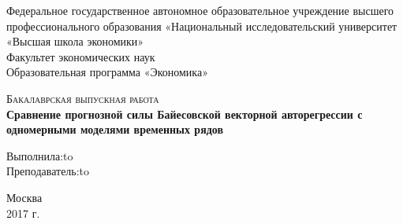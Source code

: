 \begin{titlepage}
  \begin{center}
Федеральное государственное автономное образовательное учреждение высшего профессионального образования «Национальный исследовательский университет «Высшая школа экономики»\\
\large
\vspace{0.5cm}
Факультет экономических наук\\
\vspace{0.25cm}
Образовательная программа «Экономика»
\vfill
    
\textsc{Бакалаврская выпускная работа}\\[5mm]
{\textbf{\large Сравнение прогнозной силы Байесовской векторной авторегрессии с одномерными моделями временных рядов}\\[2mm]}
\bigskip   
\end{center}
\vfill
\vfill

\newbox{\lbox}  \newlength{\maxl} \setlength{\maxl}{\wd\lbox} \hfill\parbox{10cm}{ \hspace*{5cm}\hspace*{-5cm}Выполнила:\hfill\hbox to\\ \hspace*{5cm}\hspace*{-5cm}Преподаватель:\hfill\hbox to\\  } 

\vfill



\begin{center}
  Москва\\ 2017 г.
\end{center}

\end{titlepage}